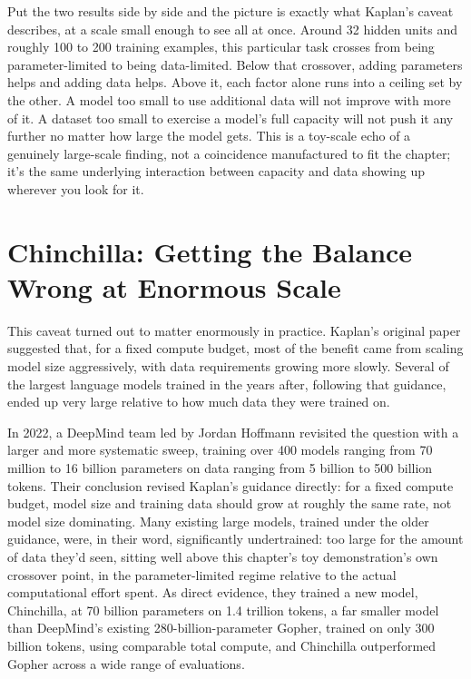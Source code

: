 Put the two results side by side and the picture is exactly what Kaplan's caveat describes, at a scale small enough to see all at once. Around 32 hidden units and roughly 100 to 200 training examples, this particular task crosses from being parameter-limited to being data-limited. Below that crossover, adding parameters helps and adding data helps. Above it, each factor alone runs into a ceiling set by the other. A model too small to use additional data will not improve with more of it. A dataset too small to exercise a model's full capacity will not push it any further no matter how large the model gets. This is a toy-scale echo of a genuinely large-scale finding, not a coincidence manufactured to fit the chapter; it's the same underlying interaction between capacity and data showing up wherever you look for it.

\section*{Chinchilla: Getting the Balance Wrong at Enormous Scale}

This caveat turned out to matter enormously in practice. Kaplan's original paper suggested that, for a fixed compute budget, most of the benefit came from scaling model size aggressively, with data requirements growing more slowly. Several of the largest language models trained in the years after, following that guidance, ended up very large relative to how much data they were trained on.

In 2022, a DeepMind team led by Jordan Hoffmann revisited the question with a larger and more systematic sweep, training over 400 models ranging from 70 million to 16 billion parameters on data ranging from 5 billion to 500 billion tokens. Their conclusion revised Kaplan's guidance directly: for a fixed compute budget, model size and training data should grow at roughly the same rate, not model size dominating. Many existing large models, trained under the older guidance, were, in their word, significantly undertrained: too large for the amount of data they'd seen, sitting well above this chapter's toy demonstration's own crossover point, in the parameter-limited regime relative to the actual computational effort spent. As direct evidence, they trained a new model, Chinchilla, at 70 billion parameters on 1.4 trillion tokens, a far smaller model than DeepMind's existing 280-billion-parameter Gopher, trained on only 300 billion tokens, using comparable total compute, and Chinchilla outperformed Gopher across a wide range of evaluations.

